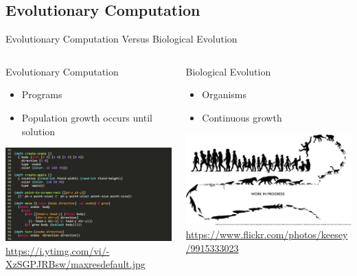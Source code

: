 \documentclass{beamer}
\begin{document}
\subsection[Evolutionary Computation]{Evolutionary Computation}
\begin{frame}{Evolutionary Computation Versus Biological Evolution}
\center
\begin{columns}
\begin{column}[t]{0.4\textwidth}
Evolutionary Computation
\begin{itemize}
\item Programs
\item Population growth occurs until solution
\end{itemize}
\center \includegraphics[width=\textwidth]{Illustrations/code.jpg}\\{\tiny \url{https://i.ytimg.com/vi/-XzSGPJRBsw/maxresdefault.jpg}}
\end{column}
\begin{column}[t]{0.4\textwidth}
Biological Evolution
\begin{itemize}
\item Organisms
\item Continuous growth 
\end{itemize}
\medskip
\center \includegraphics[width=\textwidth]{Illustrations/evolution.jpg}\\{\tiny \url{https://www.flickr.com/photos/keesey/9915333023}}
\end{column}
\end{columns}
\end{frame}
\end{document}
